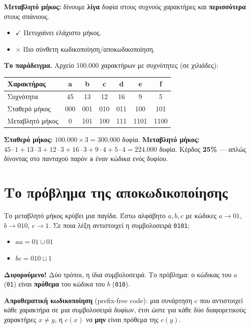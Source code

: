 \documentclass[11pt,a4paper]{article}
\begin{document}
\textbf{Μεταβλητό μήκος:} δίνουμε \textbf{λίγα} δυφία στους συχνούς χαρακτήρες
και \textbf{περισσότερα} στους σπάνιους.
\begin{itemize}
  \item $\checkmark$ Πετυχαίνει ελάχιστο μήκος.
  \item $\times$ Πιο σύνθετη κωδικοποίηση/αποκωδικοποίηση.
\end{itemize}

\begin{intuition}
\textbf{Το παράδειγμα.} Αρχείο 100.000 χαρακτήρων με συχνότητες (σε χιλιάδες):

\begin{center}
\begin{tabular}{@{}l c c c c c c@{}}
\toprule
Χαρακτήρας       & a & b & c & d & e & f \\
\midrule
Συχνότητα        & 45 & 13 & 12 & 16 & 9 & 5 \\
Σταθερό μήκος    & 000 & 001 & 010 & 011 & 100 & 101 \\
Μεταβλητό μήκος  & 0 & 101 & 100 & 111 & 1101 & 1100 \\
\bottomrule
\end{tabular}
\end{center}

\textbf{Σταθερό μήκος:} $100.000 \times 3 = 300.000$ δυφία. \textbf{Μεταβλητό
μήκος:} $45 \cdot 1 + 13 \cdot 3 + 12 \cdot 3 + 16 \cdot 3 + 9 \cdot 4 + 5 \cdot
4 = 224.000$ δυφία. Κέρδος \textbf{25\%} --- απλώς δίνοντας στο πανταχού παρόν
\texttt{a} έναν κώδικα ενός δυφίου.
\end{intuition}

\section{Το πρόβλημα της αποκωδικοποίησης}

Το μεταβλητό μήκος κρύβει μια παγίδα. Έστω αλφάβητο $a, b, c$ με κώδικες
$a \to 01$, $b \to 010$, $c \to 1$. Σε ποια λέξη αντιστοιχεί η συμβολοσειρά
\texttt{0101};
\begin{itemize}
  \item $aa = 01 \sqcup 01$
  \item $bc = 010 \sqcup 1$
\end{itemize}
\textbf{Διφορούμενο!} Δύο τρόποι, η ίδια συμβολοσειρά. Το πρόβλημα: ο κώδικας του
$a$ (\texttt{01}) είναι \textbf{πρόθεμα} του κώδικα του $b$ (\texttt{010}).

\begin{keypoint}
\textbf{Απροθεματική κωδικοποίηση} (prefix-free code): μια συνάρτηση $c$ που
αντιστοιχεί κάθε χαρακτήρα σε μια συμβολοσειρά δυφίων, έτσι ώστε για κάθε δύο
διαφορετικούς χαρακτήρες $x \ne y$, η $c(x)$ να \textbf{μην} είναι πρόθεμα της
$c(y)$.
\end{keypoint}
\end{document}
